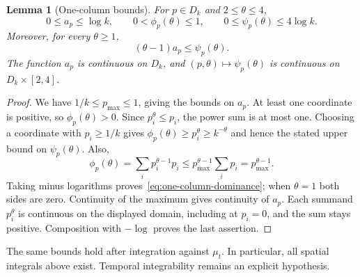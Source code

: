 \documentclass[11pt]{article}
\numberwithin{equation}{section}
\newtheorem{lemma}[theorem]{Lemma}
\theoremstyle{definition}
\theoremstyle{remark}
\newcommand{\1}{\mathbf 1}
\begin{document}
\begin{lemma}[One-column bounds]%
\label{lem:scalar-bounds}
For $p\in D_k$ and $2\le\theta\le4$,
\[
 0\le a_p\le\log k,\qquad
 0<\phi_p(\theta)\le1,\qquad
 0\le\psi_p(\theta)\le4\log k.
\]
Moreover, for every $\theta\ge1$,
\begin{equation}%
\label{eq:one-column-dominance}
 (\theta-1)a_p\le\psi_p(\theta).
\end{equation}
The function $a_p$ is continuous on $D_k$, and
$(p,\theta)\mapsto\psi_p(\theta)$ is continuous on $D_k\times[2,4]$.
\end{lemma}

\begin{proof}
We have $1/k\le p_{\max}\le1$, giving the bounds on $a_p$.
At least one coordinate is positive, so $\phi_p(\theta)>0$.
Since $p_i^\theta\le p_i$, the power sum is at most one. Choosing a
coordinate with $p_i\ge1/k$ gives
$\phi_p(\theta)\ge p_i^\theta\ge k^{-\theta}$ and hence the stated
upper bound on $\psi_p(\theta)$. Also,
\[
 \phi_p(\theta)=\sum_i p_i^{\theta-1}p_i
 \le p_{\max}^{\theta-1}\sum_i p_i=p_{\max}^{\theta-1}.
\]
Taking minus logarithms proves~\eqref{eq:one-column-dominance}; when
$\theta=1$ both sides are zero. Continuity of the maximum gives
continuity of $a_p$. Each summand $p_i^\theta$ is continuous on the
displayed domain, including at $p_i=0$, and the sum stays positive.
Composition with $-\log$ proves the last assertion.
\end{proof}

The same bounds hold after integration against $\mu_t$. In particular,
all spatial integrals above exist. Temporal integrability remains an
explicit hypothesis.
\end{document}
